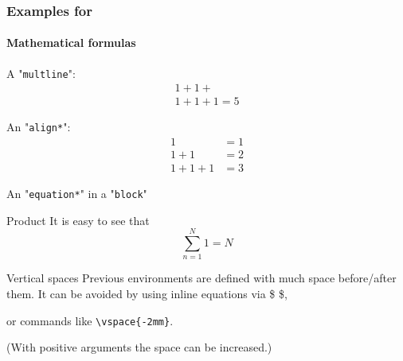 \documentclass{beamer}
\begin{document}
	\begin{frame}
		\frametitle{Examples for}
		\framesubtitle{Mathematical formulas}
		
		A "\texttt{multline}":
		\begin{multline}
		1 + 1+ \\ 1+ 1 + 1 = 5
		\end{multline}
		
		An "\texttt{align*}":
		\begin{align*}
		 1 &= 1 \\
		 1+1&=2 \\
		 1+1+1 &= 3
		\end{align*}
		
		An "\texttt{equation*}" in a "\texttt{block}"
		\begin{block}{Product}
			It is easy to see that
			\begin{equation*}
				\sum_{n=1}^N 1 = N
			\end{equation*}
		\end{block}
		
	\end{frame}
	
	\begin{frame}{Vertical spaces}
		Previous environments are defined with much space before/after them. It can be avoided by using inline equations via \$ \$,
		
		\vspace{3mm}
		
		or commands like \texttt{\textbackslash vspace\{-2mm\}}.
		
		\vspace{3mm}
		
		(With positive arguments the space can be increased.)
	\end{frame}
	
\end{document}
